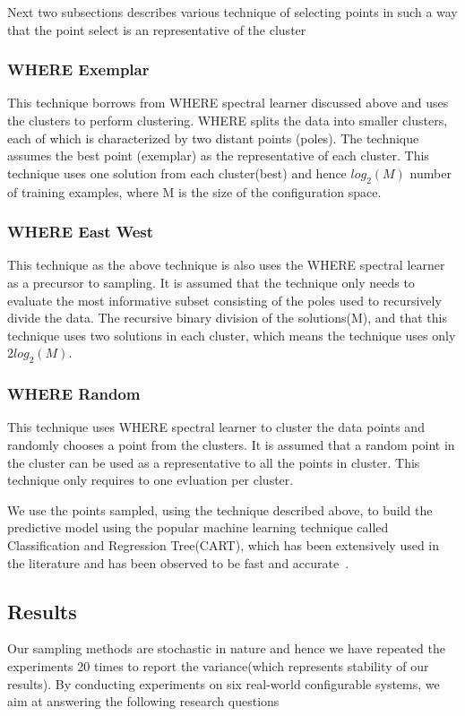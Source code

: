 \documentclass{sig-alternative}
\begin{document}
Next two subsections describes various technique of selecting points in such a way that the point select is an representative of the cluster

\subsubsection{WHERE Exemplar}\label{where_exemplar}
This technique borrows from WHERE spectral learner discussed above and uses the clusters to perform clustering. WHERE splits the data into smaller clusters, each of which is characterized by two distant points (poles). 
 The technique assumes the best point (exemplar) as the representative of each cluster. This technique uses one solution from each cluster(best) and hence $log_2(M)$ number of training examples, where M is the size of the configuration space.

\subsubsection{WHERE East West}\label{where_east_west}
This technique as the above technique is also uses the WHERE spectral learner as a precursor to sampling. 
It is assumed  that the technique only needs to evaluate
the most informative subset consisting of the poles used to
recursively divide the data. The recursive binary division of the solutions(M), and that this technique uses two solutions in each cluster, which means the technique uses only $2log_2(M)$.

\subsubsection{WHERE Random}\label{where_random}
This technique uses WHERE spectral learner to cluster the data points and randomly chooses a point from the clusters. It is assumed that a random point in the cluster can be used as a representative to all the points in cluster. This technique only requires to one evluation per cluster.




We use the points sampled, using the technique described above, to build the predictive model using the popular machine learning technique called Classification and Regression Tree(CART), which has been extensively used in the literature and has been observed to be fast and accurate~\cite{guo2013variability}.

\subsection{Results}
Our sampling methods are stochastic in nature and hence we have repeated the experiments 20 times to report the variance(which represents stability of our results). 
By conducting experiments on six real-world configurable systems, we aim at answering the following research questions
\end{document}
